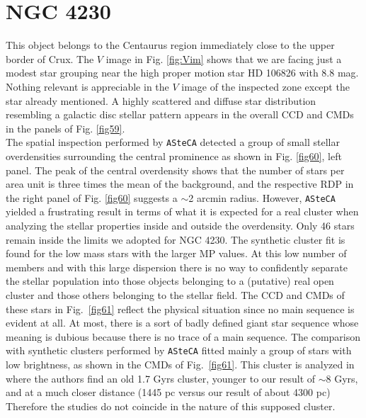 \documentclass[draft]{aa}
\begin{document}
\section{NGC 4230}

This object belongs to the Centaurus region immediately close to the upper
border of Crux. The $V$ image in Fig. \ref{fig:Vim} shows that we are facing
just a modest star grouping near the high proper motion star HD 106826 with 8.8
mag.
Nothing relevant is appreciable in the $V$ image of the inspected zone except
the star already mentioned. A highly scattered and diffuse star distribution
resembling a galactic disc stellar pattern appears in the overall CCD
and CMDs in the panels of Fig. \ref{fig59}.\\

The spatial inspection performed by \texttt{ASteCA} detected a group of small
stellar overdensities surrounding the central prominence as shown in Fig.
\ref{fig60}, left panel. The peak of the central overdensity shows that the
number of stars per area unit is three times the mean of the background, and the
respective RDP in the right panel of Fig. \ref{fig60} suggests a $\sim$2 arcmin
radius.
However, \texttt{ASteCA} yielded a frustrating result in terms of what
it is expected for a real cluster when analyzing the stellar properties inside
and outside the overdensity.
Only 46 stars remain inside the limits we adopted for NGC 4230. The synthetic
cluster fit is found for the low mass stars with the larger MP values. At this
low number of members and with this large dispersion there is no way to
confidently separate the stellar population into those objects belonging to a 
(putative) real open cluster and those others belonging to the stellar field.
%
The CCD and CMDs of these stars in Fig.~\ref{fig61} reflect the physical
situation since no main sequence is evident at all. At most, there is a sort of
badly defined giant star sequence whose meaning is dubious because there is no
trace of a main sequence.
The comparison with synthetic clusters performed by \texttt{ASteCA}
fitted mainly a group of stars with low brightness, as shown in the CMDs of
Fig.~\ref{fig61}. This cluster is analyzed in \cite{Tadross_2011} where the
authors find an old 1.7 Gyrs cluster, younger to our result of $\sim$8 Gyrs,
and at a much closer distance (1445 pc versus our result of about 4300 pc)
Therefore the studies do not coincide in the nature of this supposed cluster.\\
\end{document}
